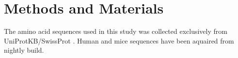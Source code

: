 \section{Methods and Materials}

The amino acid sequences used in this study was collected exclusively from UniProtKB/SwissProt \cite{Magrane:2011fv}. Human and mice sequences have been aquaired from nightly build. 